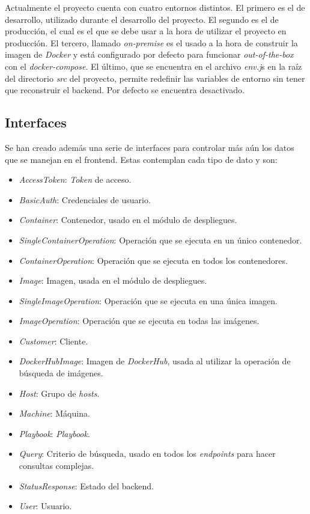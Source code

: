 \bigskip
Actualmente el proyecto cuenta con cuatro entornos distintos. El primero es el de desarrollo, utilizado durante el desarrollo del proyecto. El segundo es el de producción, el cual es el que se debe usar a la hora de utilizar el proyecto en producción. El tercero, llamado \textit{on-premise} es el usado a la hora de construir la imagen de \textit{Docker} y está configurado por defecto para funcionar \textit{out-of-the-box} con el \textit{docker-compose}. El último, que se encuentra en el archivo \textit{env.j}s en la raíz del directorio \textit{src} del proyecto, permite redefinir las variables de entorno sin tener que reconstruir el backend. Por defecto se encuentra desactivado.


\subsection{Interfaces}


Se han creado además una serie de interfaces para controlar más aún los datos que se manejan en el frontend. Estas contemplan cada tipo de dato y son:
\begin{itemize}
	\item \textit{AccessToken}: \textit{Token} de acceso.
	\item \textit{BasicAuth}: Credenciales de usuario.
	\item \textit{Container}: Contenedor, usado en el módulo de despliegues.
	\item \textit{SingleContainerOperation}: Operación que se ejecuta en un único contenedor.
	\item \textit{ContainerOperation}: Operación que se ejecuta en todos los contenedores.
	\item \textit{Image}: Imagen, usada en el módulo de despliegues.
	\item \textit{SingleImageOperation}: Operación que se ejecuta en una única imagen.
	\item \textit{ImageOperation}: Operación que se ejecuta en todas las imágenes.
	\item \textit{Customer}: Cliente.
	\item \textit{DockerHubImage}: Imagen de \textit{DockerHub}, usada al utilizar la operación de búsqueda de imágenes.
	\item \textit{Host}: Grupo de \textit{hosts}.
	\item \textit{Machine}: Máquina.
	\item \textit{Playbook}: \textit{Playbook}.
	\item \textit{Query}: Criterio de búsqueda, usado en todos los \textit{endpoints} para hacer consultas complejas.
	\item \textit{StatusResponse}: Estado del backend.
	\item \textit{User}: Usuario.
\end{itemize}


